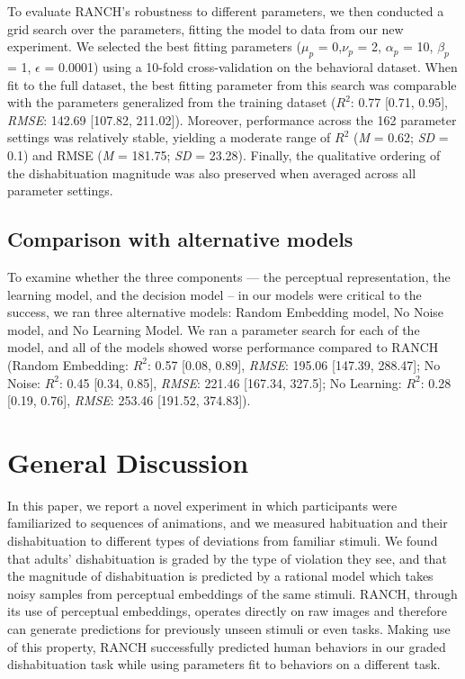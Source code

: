 \documentclass[10pt, letterpaper]{article}
\begin{document}
To evaluate RANCH's robustness to different parameters, we then
conducted a grid search over the parameters, fitting the model to data
from our new experiment. We selected the best fitting parameters
(\(\mu_{p}\) = 0,\(\nu_{p}\) = 2, \(\alpha_{p}\) = 10, \(\beta_{p}\) =
1, \(\epsilon\) = 0.0001) using a 10-fold cross-validation on the
behavioral dataset. When fit to the full dataset, the best fitting
parameter from this search was comparable with the parameters
generalized from the training dataset (\(R^2\): 0.77 {[}0.71, 0.95{]},
\emph{RMSE}: 142.69 {[}107.82, 211.02{]}). Moreover, performance across
the 162 parameter settings was relatively stable, yielding a moderate
range of \(R^2\) (\emph{M} = 0.62; \emph{SD} = 0.1) and RMSE (\emph{M} =
181.75; \emph{SD} = 23.28). Finally, the qualitative ordering of the
dishabituation magnitude was also preserved when averaged across all
parameter settings.

\hypertarget{comparison-with-alternative-models}{%
\subsection{Comparison with alternative
models}\label{comparison-with-alternative-models}}

To examine whether the three components --- the perceptual
representation, the learning model, and the decision model -- in our
models were critical to the success, we ran three alternative models:
Random Embedding model, No Noise model, and No Learning Model. We ran a
parameter search for each of the model, and all of the models showed
worse performance compared to RANCH (Random Embedding: \(R^2\): 0.57
{[}0.08, 0.89{]}, \emph{RMSE}: 195.06 {[}147.39, 288.47{]}; No Noise:
\(R^2\): 0.45 {[}0.34, 0.85{]}, \emph{RMSE}: 221.46 {[}167.34, 327.5{]};
No Learning: \(R^2\): 0.28 {[}0.19, 0.76{]}, \emph{RMSE}: 253.46
{[}191.52, 374.83{]}).

\hypertarget{general-discussion}{%
\section{General Discussion}\label{general-discussion}}

In this paper, we report a novel experiment in which participants were
familiarized to sequences of animations, and we measured habituation and
their dishabituation to different types of deviations from familiar
stimuli. We found that adults' dishabituation is graded by the type of
violation they see, and that the magnitude of dishabituation is
predicted by a rational model which takes noisy samples from perceptual
embeddings of the same stimuli. RANCH, through its use of perceptual
embeddings, operates directly on raw images and therefore can generate
predictions for previously unseen stimuli or even tasks. Making use of
this property, RANCH successfully predicted human behaviors in our
graded dishabituation task while using parameters fit to behaviors on a
different task.
\end{document}

